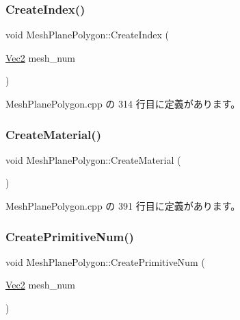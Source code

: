 \mbox{\label{class_mesh_plane_polygon_ae7067eb849977a12554633e604806f85}} 
\subsubsection{\texorpdfstring{Create\+Index()}{CreateIndex()}}
{\footnotesize\ttfamily void Mesh\+Plane\+Polygon\+::\+Create\+Index (\begin{DoxyParamCaption}\item[{\mbox{\hyperlink{_vector3_d_8h_a5ef6e95dfc5f9d3820b71772d99bbc25}{Vec2}}}]{mesh\+\_\+num }\end{DoxyParamCaption})\hspace{0.3cm}{\ttfamily [private]}}



 Mesh\+Plane\+Polygon.\+cpp の 314 行目に定義があります。

\mbox{\label{class_mesh_plane_polygon_aea5b128def1dae8f391b80be25172b36}} 
\subsubsection{\texorpdfstring{Create\+Material()}{CreateMaterial()}}
{\footnotesize\ttfamily void Mesh\+Plane\+Polygon\+::\+Create\+Material (\begin{DoxyParamCaption}{ }\end{DoxyParamCaption})\hspace{0.3cm}{\ttfamily [private]}}



 Mesh\+Plane\+Polygon.\+cpp の 391 行目に定義があります。

\mbox{\label{class_mesh_plane_polygon_a0228c78794fe950ccb69b3a77a0239b8}} 
\subsubsection{\texorpdfstring{Create\+Primitive\+Num()}{CreatePrimitiveNum()}}
{\footnotesize\ttfamily void Mesh\+Plane\+Polygon\+::\+Create\+Primitive\+Num (\begin{DoxyParamCaption}\item[{\mbox{\hyperlink{_vector3_d_8h_a5ef6e95dfc5f9d3820b71772d99bbc25}{Vec2}}}]{mesh\+\_\+num }\end{DoxyParamCaption})\hspace{0.3cm}{\ttfamily [private]}}



